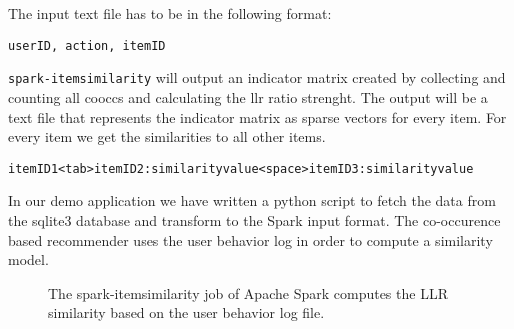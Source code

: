The input text file has to be in the following format:
\begin{verbatim}
userID, action, itemID
\end{verbatim}
\verb|spark-itemsimilarity| will output an indicator matrix created by collecting and counting all \glspl{coocc} and calculating the \gls{llr} ratio strenght. The output will be a text file that represents the indicator matrix as sparse vectors for every item. For every item we get the similarities to all other items.
\begin{verbatim}
itemID1<tab>itemID2:similarityvalue<space>itemID3:similarityvalue
\end{verbatim}

In our demo application we have written a python script to fetch the data from the sqlite3 database and transform to the Spark input format.
The co-occurence based recommender uses the user behavior log in order to compute a similarity model. 

\begin{figure}
\centering
{}
\caption{The {\ttfamily spark-itemsimilarity} job of Apache Spark computes the LLR similarity based on the user behavior log file.}
\end{figure}
